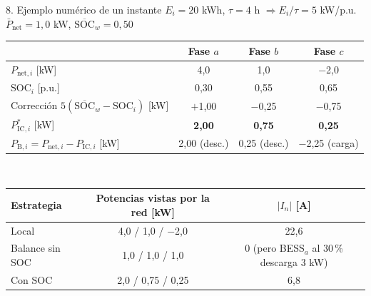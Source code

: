 \documentclass[aspectratio=169,11pt]{beamer}
\newcommand{\Pic}[1]{P_{\mathrm{IC},#1}}
\newcommand{\Picr}[1]{P^{*}_{\mathrm{IC},#1}}
\newcommand{\Pnet}[1]{P_{\mathrm{net},#1}}
\newcommand{\Pbat}[1]{P_{\mathrm{B},#1}}
\newcommand{\Pnetm}{\bar P_{\mathrm{net}}}
\newcommand{\SOC}[1]{\mathrm{SOC}_{#1}}
\newcommand{\SOCw}{\overline{\mathrm{SOC}}_{w}}
\begin{document}
\begin{frame}{8. Ejemplo numérico de un instante}
  \centering\footnotesize
  $E_i=20$ kWh, $\tau=4$ h $\Rightarrow E_i/\tau = 5$ kW/p.u. \qquad $\Pnetm=1{,}0$ kW, \quad $\SOCw=0{,}50$\\[6pt]
  \begin{tabular}{lccc}
    \toprule
    & Fase $a$ & Fase $b$ & Fase $c$ \\ \midrule
    $\Pnet{i}$ [kW] & 4{,}0 & 1{,}0 & $-$2{,}0 \\
    $\SOC{i}$ [p.u.] & 0{,}30 & 0{,}55 & 0{,}65 \\
    Corrección $5(\SOCw-\SOC{i})$ [kW] & $+$1{,}00 & $-$0{,}25 & $-$0{,}75 \\
    $\Picr{i}$ [kW] & \textbf{2{,}00} & \textbf{0{,}75} & \textbf{0{,}25} \\
    $\Pbat{i}=\Pnet{i}-\Pic{i}$ [kW] & 2{,}00 (desc.) & 0{,}25 (desc.) & $-$2{,}25 (carga) \\ \bottomrule
  \end{tabular}\\[8pt]
  \begin{tabular}{lcc}
    \toprule
    Estrategia & Potencias vistas por la red [kW] & $|I_n|$ [A] \\ \midrule
    Local & 4{,}0 / 1{,}0 / $-$2{,}0 & 22{,}6 \\
    Balance sin SOC & 1{,}0 / 1{,}0 / 1{,}0 & 0 \;(pero BESS$_a$ al 30\,\% descarga 3 kW) \\
    \alert{Con SOC} & 2{,}0 / 0{,}75 / 0{,}25 & 6{,}8 \\ \bottomrule
  \end{tabular}
\end{frame}

\end{document}
